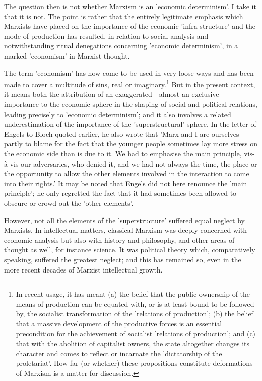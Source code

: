 The question then is not whether Marxism is an 'economic determinism'. I take it that it is not. The point is rather that the entirely legitimate emphasis which Marxists have placed on the importance of the economic 'infra-structure' and the mode of production has resulted, in relation to social analysis and notwithstanding ritual denegations concerning 'economic determinism', in a marked 'economism' in Marxist thought.

The term 'economism' has now come to be used in very loose ways and has been made to cover a multitude of sins, real or imaginary.\footnote{In recent usage, it has meant (a) the belief that the public ownership of the means of production can be equated with, or is at least bound to be followed by, the socialist transformation of the 'relations of production'; (b) the belief that a massive development of the productive forces is an essential precondition for the achievement of socialist 'relations of production'; and (c) that with the abolition of capitalist owners, the state altogether changes its character and comes to reflect or incarnate the 'dictatorship of the proletariat'. How far (or whether) these propositions constitute deformations of Marxism is a matter for discussion.} But in the present context, it means both the attribution of an exaggerated—almost an exclusive—importance to the economic sphere in the shaping of social and political relations, leading precisely to 'economic determinism'; and it also involves a related underestimation of the importance of the 'superstructural' sphere. In the letter of Engels to Bloch quoted earlier, he also wrote that 'Marx and I are ourselves partly to blame for the fact that the younger people sometimes lay more stress on the economic side than is due to it. We had to emphasise the main principle, vis-à-vis our adversaries, who denied it, and we had not always the time, the place or the opportunity to allow the other elements involved in the interaction to come into their rights.' It may be noted that Engels did not here renounce the 'main principle'; he only regretted the fact that it had sometimes been allowed to obscure or crowd out the 'other elements'.

However, not all the elements of the 'superstructure' suffered equal neglect by Marxists. In intellectual matters, classical Marxism was deeply concerned with economic analysis but also with history and philosophy, and other areas of thought as well, for instance science. It was political theory which, comparatively speaking, suffered the greatest neglect; and this has remained so, even in the more recent decades of Marxist intellectual growth.

